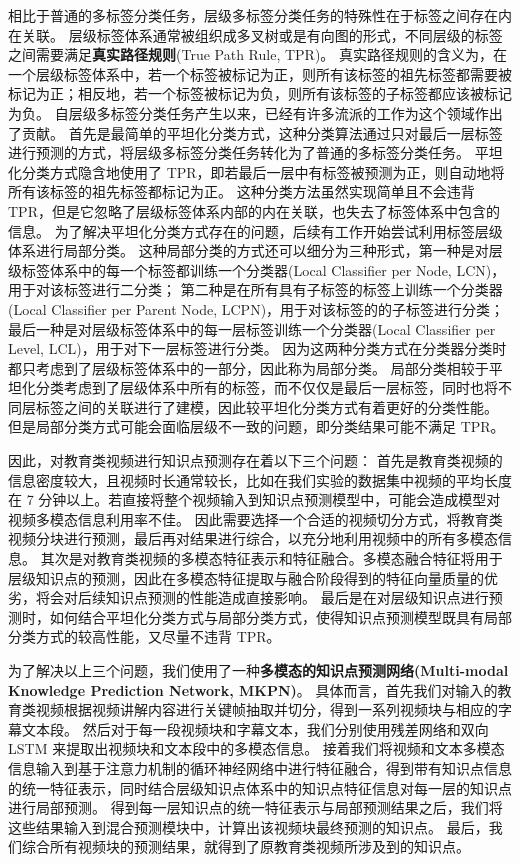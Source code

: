     相比于普通的多标签分类任务，层级多标签分类任务的特殊性在于标签之间存在内在关联。
    层级标签体系通常被组织成多叉树或是有向图的形式，不同层级的标签之间需要满足\textbf{真实路径规则}(True Path Rule, TPR)\cite{Valentini2009TruePR}。
    真实路径规则的含义为，在一个层级标签体系中，若一个标签被标记为正，则所有该标签的祖先标签都需要被标记为正；相反地，若一个标签被标记为负，则所有该标签的子标签都应该被标记为负。
    自层级多标签分类任务产生以来，已经有许多流派的工作为这个领域作出了贡献。
    首先是最简单的平坦化分类方式，这种分类算法通过只对最后一层标签\cite{Barbedo2007AutomaticGC}进行预测的方式，将层级多标签分类任务转化为了普通的多标签分类任务。
    平坦化分类方式隐含地使用了 TPR，即若最后一层中有标签被预测为正，则自动地将所有该标签的祖先标签都标记为正。
    这种分类方法虽然实现简单且不会违背 TPR，但是它忽略了层级标签体系内部的内在关联，也失去了标签体系中包含的信息。
    为了解决平坦化分类方式存在的问题，后续有工作开始尝试利用标签层级体系进行局部分类。
    这种局部分类的方式还可以细分为三种形式，第一种是对层级标签体系中的每一个标签都训练一个分类器(Local Classifier per Node, LCN)\cite{CesaBianchi2004IncrementalAF}，用于对该标签进行二分类；
    第二种是在所有具有子标签的标签上训练一个分类器(Local Classifier per Parent Node, LCPN)\cite{Secker2007AnEC}，用于对该标签的的子标签进行分类；
    最后一种是对层级标签体系中的每一层标签训练一个分类器(Local Classifier per Level, LCL)\cite{Freitas2007ATO}，用于对下一层标签进行分类。
    因为这两种分类方式在分类器分类时都只考虑到了层级标签体系中的一部分，因此称为局部分类。
    局部分类相较于平坦化分类考虑到了层级体系中所有的标签，而不仅仅是最后一层标签，同时也将不同层标签之间的关联进行了建模，因此较平坦化分类方式有着更好的分类性能。
    但是局部分类方式可能会面临层级不一致的问题，即分类结果可能不满足 TPR。

    因此，对教育类视频进行知识点预测存在着以下三个问题：
    首先是教育类视频的信息密度较大，且视频时长通常较长，比如在我们实验的数据集中视频的平均长度在 7 分钟以上。若直接将整个视频输入到知识点预测模型中，可能会造成模型对视频多模态信息利用率不佳。
    因此需要选择一个合适的视频切分方式，将教育类视频分块进行预测，最后再对结果进行综合，以充分地利用视频中的所有多模态信息。
    其次是对教育类视频的多模态特征表示和特征融合。多模态融合特征将用于层级知识点的预测，因此在多模态特征提取与融合阶段得到的特征向量质量的优劣，将会对后续知识点预测的性能造成直接影响。
    最后是在对层级知识点进行预测时，如何结合平坦化分类方式与局部分类方式，使得知识点预测模型既具有局部分类方式的较高性能，又尽量不违背 TPR。

    为了解决以上三个问题，我们使用了一种\textbf{多模态的知识点预测网络(Multi-modal Knowledge Prediction Network, MKPN)}。
    具体而言，首先我们对输入的教育类视频根据视频讲解内容进行关键帧抽取并切分，得到一系列视频块与相应的字幕文本段。
    然后对于每一段视频块和字幕文本，我们分别使用残差网络和双向 LSTM 来提取出视频块和文本段中的多模态信息。
    接着我们将视频和文本多模态信息输入到基于注意力机制的循环神经网络中进行特征融合，得到带有知识点信息的统一特征表示，同时结合层级知识点体系中的知识点特征信息对每一层的知识点进行局部预测。
    得到每一层知识点的统一特征表示与局部预测结果之后，我们将这些结果输入到混合预测模块中，计算出该视频块最终预测的知识点。
    最后，我们综合所有视频块的预测结果，就得到了原教育类视频所涉及到的知识点。

